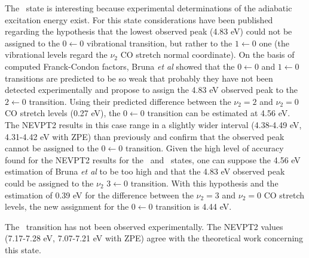 The \tpipi\ state is interesting because experimental determinations of the
adiabatic excitation energy exist. For this state considerations have been
published\cite{cp-70-291-1982} regarding the hypothesis that the lowest
observed peak (4.83 eV) could not be assigned to the $0\leftarrow0$ 
vibrational transition, but rather to  the $1\leftarrow0$ one (the
vibrational levels regard the $\nu_2$ CO stretch normal coordinate).
On the basis of computed Franck-Condon factors, Bruna {\it et
al}\cite{jpc-99-16576-1995} showed that the $0\leftarrow0$ and
$1\leftarrow0$ transitions are predicted to be so weak that probably they
have not been detected experimentally and propose to assign the 4.83 eV
observed peak to the $2\leftarrow0$ transition. 
Using their predicted difference between the $\nu_2=2$ and $\nu_2=0$  CO
stretch levels (0.27 eV), the $0\leftarrow0$ transition can be estimated at
4.56 eV. The NEVPT2 results in this case range in a slightly wider interval
(4.38-4.49 eV, 4.31-4.42 eV with ZPE) than previously and confirm that the
observed peak cannot be assigned to the $0\leftarrow0$ transition. Given the
high level of accuracy found for the NEVPT2 results for the  \snpi\ and
\tnpi\ states, one can suppose the 4.56 eV  estimation of Bruna {\it et
al}\cite{jpc-99-16576-1995} to be too high and that the 4.83 eV observed
peak could be assigned to the  $\nu_2$ $3\leftarrow0$ transition. With this
hypothesis and the estimation of 0.39 eV for the difference between the
$\nu_2=3$ and $\nu_2=0$  CO stretch levels\cite{jpc-99-16576-1995}, the new
assignment for the $0\leftarrow0$ transition is 4.44 eV.


The \tspi\ transition has not been observed experimentally.  The NEVPT2
values (7.17-7.28 eV, 7.07-7.21 eV with ZPE) agree with the theoretical
work\cite{jpc-99-16576-1995} concerning this state.

